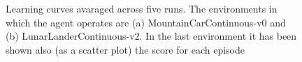 \documentclass[11pt]{article}
\begin{document}
\begin{figure}[h!]
        \caption{ Learning curves avaraged across five runs. 
                The environments in which the agent operates are 
                (a) MountainCarContinuous-v0 and (b) LunarLanderContinuous-v2.
                In the last environment it has been shown also (as a scatter plot) the score
                for each episode}
        \label{fig:plots}
\end{figure}
\end{document}
